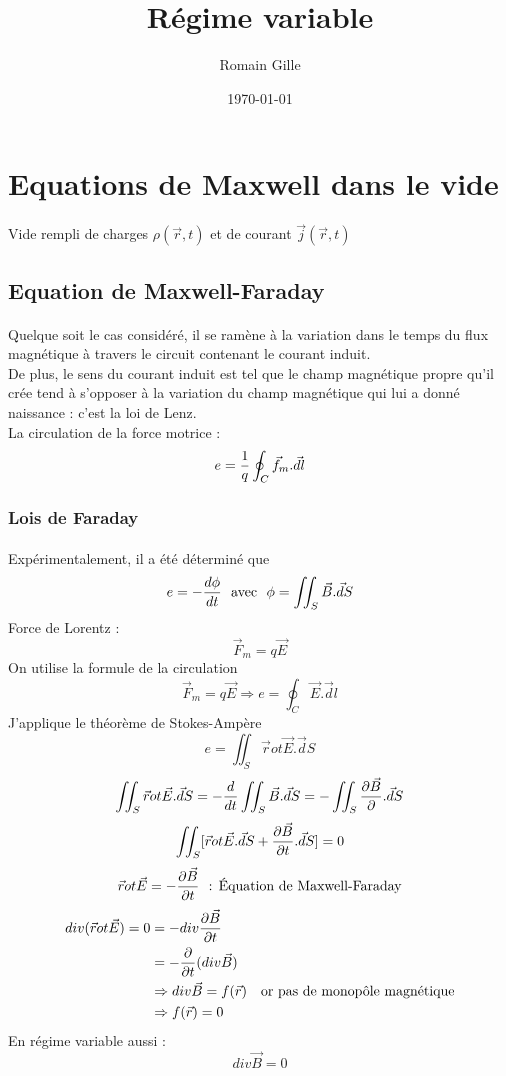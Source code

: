 \documentclass[11pt,a4paper,french]{article}
\title{Régime variable}
\author{Romain Gille}
\date{\today}
\begin{document}
\maketitle
\newpage
\section{Equations de Maxwell dans le vide}
\paragraph{}
Vide rempli de charges $\rho(\vec r, t)$ et de courant $\vec j(\vec r, t)$
\subsection{Equation de Maxwell-Faraday}
\paragraph{}
Quelque soit le cas considéré, il se ramène à la variation dans le temps du flux magnétique à travers le circuit contenant le courant induit. \\
De plus, le sens du courant induit est tel que le champ magnétique propre qu'il crée tend à s'opposer à la variation du champ magnétique qui lui a donné naissance : c'est la loi de Lenz. \\
La circulation de la force motrice :
$$e = {1 \over q} \oint_C \vec f_m . \vec dl$$
\subsubsection{Lois de Faraday}
\paragraph{}
Expérimentalement, il a été déterminé que 
$$e = - {d\phi \over dt}~~\text{avec}~~\phi = \iint_S \vec B . \vec dS$$
Force de Lorentz :
$$\vec F_m = q \vec E$$
On utilise la formule de la circulation
$$\vec F_m = q \vec E \Rightarrow e = \oint_C \vec E . \vec dl$$
J'applique le théorème de Stokes-Ampère
$$e = \iint_S \vec rot\vec E . \vec dS$$
$$\iint_S \vec rot \vec E . \vec dS = - {d \over dt} \iint_S \vec B . \vec dS = - \iint_S {\partial \vec B \over \partial}. \vec dS$$
$$\iint_S [\vec rot\vec E . \vec dS + {\partial \vec B \over \partial t} . \vec dS] = 0$$
$$\vec rot \vec E = -{\partial \vec B \over \partial t}~~\text{: Équation de Maxwell-Faraday}$$
\clearpage
\begin{align*}
div(\vec rot \vec E) = 0 &= - div {\partial \vec B \over \partial t} \\
&= - {\partial \over \partial t}(div \vec B) \\
& \Rightarrow div \vec B = f(\vec r)~~~\text{or pas de monopôle magnétique} \\
& \Rightarrow f(\vec r) = 0
\end{align*}
En régime variable aussi : 
$$div\vec B = 0$$
\end{document}
